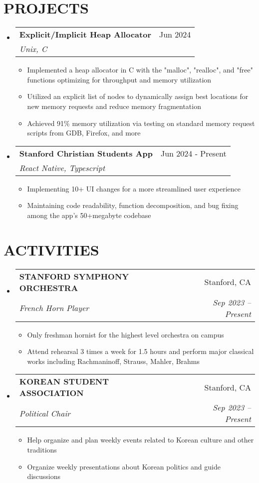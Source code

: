 \documentclass[letterpaper,11pt]{article}
\makeatletter
\newcommand{\resumeItem}[1]{
  \item\small{
    {#1 \vspace{-4pt}}
  }
}
\newcommand{\resumeSubheading}[4]{
  \vspace{-3pt}\item
    \begin{tabular*}{0.97\textwidth}[t]{l@{\extracolsep{\fill}}r}
      \vspace{-2pt}
      \textbf{\fontsize{10}{10}\selectfont #1} & \small#2 \\
      \textit{\small#3} & \textit{\small #4} \\
    \end{tabular*}\vspace{-10pt}
}
\newcommand{\resumeSubHeadingListStart}{\begin{itemize}[leftmargin=0in, label={}]}
\newcommand{\resumeSubHeadingListEnd}{\end{itemize}}
\newcommand{\resumeItemListStart}{\begin{itemize}[leftmargin=0.2in]}
\newcommand{\resumeItemListEnd}{\end{itemize}\vspace{-5pt}}
\makeatother
\begin{document}
  \section{\textbf{PROJECTS}}
  \resumeSubHeadingListStart
    \resumeSubheading
    {Explicit/Implicit Heap Allocator}{Jun 2024}
    {Unix, C}{}
    \resumeItemListStart
        \resumeItem{Implemented a heap allocator in C with the "malloc", "realloc", and "free" functions optimizing for throughput and memory utilization}
        \resumeItem{Utilized an explicit list of nodes to dynamically assign best locations for new memory requests and reduce memory fragmentation}
        \resumeItem{Achieved 91\% memory utilization via testing on standard memory request scripts from GDB, Firefox, and more }
    \resumeItemListEnd
    \resumeSubheading
    {Stanford Christian Students App}{Jun 2024 - Present}
    {React Native, Typescript}{}
    \resumeItemListStart
        \resumeItem{Implementing 10+ UI changes for a more streamlined user experience}
        \resumeItem{Maintaining code readability, function decomposition, and bug fixing among the app's 50+megabyte codebase}
    \resumeItemListEnd
  \resumeSubHeadingListEnd
  
  \section{\textbf{ACTIVITIES}}
  \resumeSubHeadingListStart

    \resumeSubheading
      {STANFORD SYMPHONY ORCHESTRA}{Stanford, CA}
      {French Horn Player}{Sep 2023 -- Present}
      \resumeItemListStart
      \resumeItem{Only freshman hornist for the highest level orchestra on campus}
      \resumeItem{Attend rehearsal 3 times a week for 1.5 hours and perform major classical works including Rachmaninoff, Strauss, Mahler, Brahms}
      \resumeItemListEnd
      
    \resumeSubheading
      {KOREAN STUDENT ASSOCIATION}{Stanford, CA}
      {Political Chair}{Sep 2023 -- Present}
      \resumeItemListStart
        \resumeItem{Help organize and plan weekly events related to Korean culture and other traditions}
        \resumeItem{Organize weekly presentations about Korean politics and guide discussions}
        \resumeItemListEnd
        \vspace{-2pt}
  \resumeSubHeadingListEnd

\end{document}
